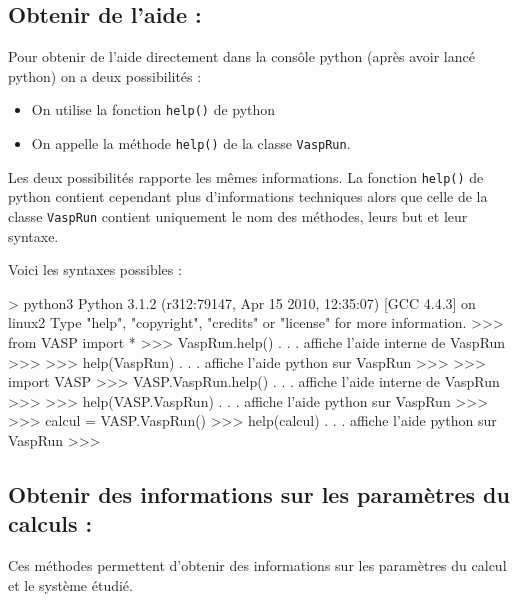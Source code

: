 \documentclass[10pt,a4paper,fleqn]{article}
\begin{document}
\subsection{Obtenir de l'aide :}

Pour obtenir de l'aide directement dans la consôle python (après avoir lancé python) on a deux
possibilités :

\begin{itemize}
	\item On utilise la fonction \verb!help()! de python
	\item On appelle la méthode \verb!help()! de la classe \verb!VaspRun!.
\end{itemize}

Les deux possibilités rapporte les mêmes informations. La fonction \verb!help()! de python contient
cependant plus d'informations techniques alors que celle de la classe \verb!VaspRun! contient
uniquement le nom des méthodes, leurs but et leur syntaxe.

Voici les syntaxes possibles :

\begin{console}
> python3
Python 3.1.2 (r312:79147, Apr 15 2010, 12:35:07) 
[GCC 4.4.3] on linux2
Type "help", "copyright", "credits" or "license" for more information.
>>> from VASP import *
>>> VaspRun.help()
. . . affiche l'aide interne de VaspRun
>>>
>>> help(VaspRun)
. . . affiche l'aide python sur VaspRun
>>>
>>> import VASP
>>> VASP.VaspRun.help()
. . . affiche l'aide interne de VaspRun
>>>
>>> help(VASP.VaspRun)
. . . affiche l'aide python sur VaspRun
>>>
>>> calcul = VASP.VaspRun()
>>> help(calcul)
. . . affiche l'aide python sur VaspRun
>>>
\end{console}

\subsection{Obtenir des informations sur les paramètres du calculs :}

Ces méthodes permettent d'obtenir des informations sur les paramètres du calcul et le système
étudié.
\end{document}
